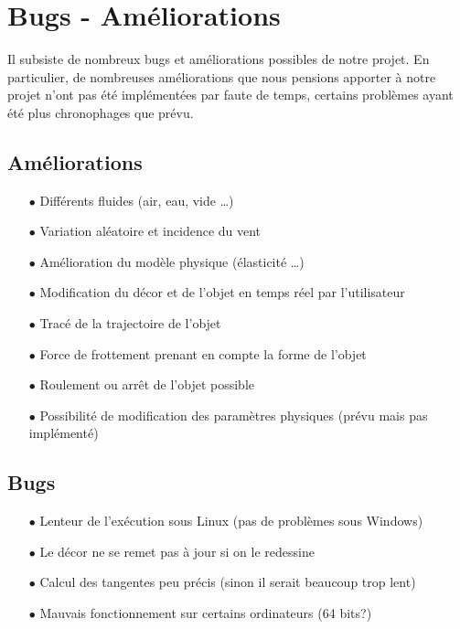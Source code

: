 \newpage

\section{Bugs - Améliorations}
Il subsiste de nombreux bugs et améliorations possibles de notre projet.
En particulier, de nombreuses améliorations que nous pensions apporter
à notre projet n'ont pas été implémentées par faute de temps, certains 
problèmes ayant été plus chronophages que prévu.
\subsection{Améliorations}
\begin{itemize}
\item[$\bullet$] Différents fluides (air, eau, vide \dots)
\item[$\bullet$] Variation aléatoire et incidence du vent 
\item[$\bullet$] Amélioration du modèle physique (élasticité \dots )
\item[$\bullet$] Modification du décor et de l'objet en temps réel par l'utilisateur
\item[$\bullet$] Tracé de la trajectoire de l'objet
\item[$\bullet$] Force de frottement prenant en compte la forme de l'objet
\item[$\bullet$] Roulement ou arrêt de l'objet possible
\item[$\bullet$] Possibilité de modification des paramètres physiques (prévu mais pas implémenté)
\end{itemize}
\subsection{Bugs}
\begin{itemize}
\item[$\bullet$] Lenteur de l'exécution sous Linux (pas de problèmes sous Windows)
\item[$\bullet$] Le décor ne se remet pas à jour si on le redessine
\item[$\bullet$] Calcul des tangentes peu précis (sinon il serait beaucoup trop lent)
\item[$\bullet$] Mauvais fonctionnement sur certains ordinateurs (64 bits?)
\end{itemize}
